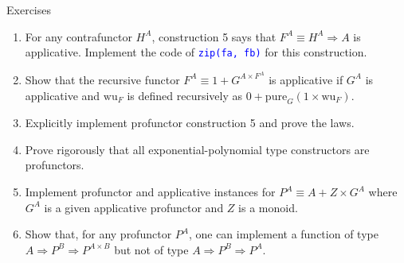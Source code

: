\documentclass[english]{beamer}
\begin{document}
\begin{frame}{Exercises}
\begin{enumerate}
{and prove the laws.}{\footnotesize \par}
\item {\footnotesize{}For any contrafunctor $H^{A}$, construction 5 says
that $F^{A}\equiv H^{A}\Rightarrow A$ is applicative. Implement the
code of }\texttt{\textcolor{blue}{\footnotesize{}zip(fa, fb)}}{\footnotesize{}
for this construction.}{\footnotesize \par}
\item {\footnotesize{}Show that the recursive functor $F^{A}\equiv1+G^{A\times F^{A}}$
is applicative if $G^{A}$ is applicative and $\text{wu}_{F}$ is
defined recursively as $0+\text{pure}_{G}\left(1\times\text{wu}_{F}\right)$.}{\footnotesize \par}
\item {\footnotesize{}Explicitly implement profunctor construction 5 and
prove the laws. }{\footnotesize \par}
\item {\footnotesize{}Prove rigorously that all exponential-polynomial type
constructors are profunctors.}{\footnotesize \par}
\item {\footnotesize{}Implement profunctor and applicative instances for
$P^{A}\equiv A+Z\times G^{A}$ where $G^{A}$ is a given applicative
profunctor and $Z$ is a monoid.}{\footnotesize \par}
\item {\footnotesize{}Show that, for any profunctor $P^{A}$, one can implement
a function of type $A\Rightarrow P^{B}\Rightarrow P^{A\times B}$
but not of type $A\Rightarrow P^{B}\Rightarrow P^{A}$. }{\footnotesize \par}
\end{enumerate}
\end{frame}
\end{document}
